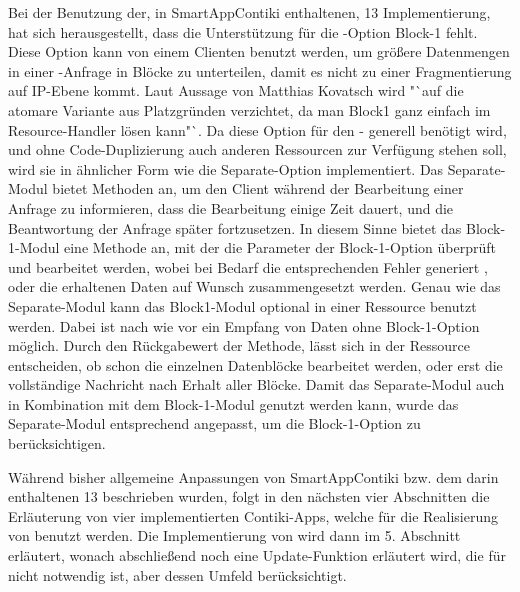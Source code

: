 Bei der Benutzung der, in SmartAppContiki enthaltenen,  13 Implementierung, hat sich herausgestellt, dass die Unterstützung für die -Option
Block-1 fehlt. Diese Option kann von einem Clienten benutzt werden, um größere Datenmengen in einer -Anfrage in Blöcke zu unterteilen, damit es nicht
zu einer Fragmentierung auf IP-Ebene kommt. Laut Aussage von Matthias Kovatsch wird "`auf die atomare Variante aus Platzgründen verzichtet, da man Block1 ganz
einfach im Resource-Handler lösen kann"`. Da diese Option für den - generell benötigt wird, und ohne Code-Duplizierung auch anderen Ressourcen
zur Verfügung stehen soll, wird sie in ähnlicher Form wie die Separate-Option implementiert. Das Separate-Modul bietet Methoden an, um den Client während der
Bearbeitung einer Anfrage zu informieren, dass die Bearbeitung einige Zeit dauert, und die Beantwortung der Anfrage später fortzusetzen. In diesem Sinne bietet
das Block-1-Modul eine Methode an, mit der die Parameter der Block-1-Option überprüft und bearbeitet werden, wobei bei Bedarf die entsprechenden Fehler generiert
, oder die erhaltenen Daten auf Wunsch zusammengesetzt werden. Genau wie das Separate-Modul kann das Block1-Modul optional in einer Ressource benutzt werden.
Dabei ist nach wie vor ein Empfang von Daten ohne Block-1-Option möglich. Durch den Rückgabewert der Methode, lässt sich in der Ressource entscheiden, ob schon
die einzelnen Datenblöcke bearbeitet werden, oder erst die vollständige Nachricht nach Erhalt aller Blöcke. Damit das Separate-Modul auch in Kombination mit dem
Block-1-Modul genutzt werden kann, wurde das Separate-Modul entsprechend angepasst, um die Block-1-Option zu berücksichtigen.

Während bisher allgemeine Anpassungen von SmartAppContiki bzw. dem darin enthaltenen  13 beschrieben wurden, folgt in den nächsten vier Abschnitten
die Erläuterung von vier implementierten Contiki-Apps, welche für die Realisierung von  benutzt werden. Die Implementierung von  wird dann
im 5. Abschnitt erläutert, wonach abschließend noch eine Update-Funktion erläutert wird, die für  nicht notwendig ist, aber dessen Umfeld berücksichtigt.






